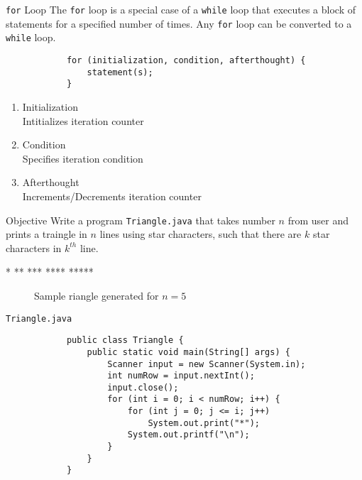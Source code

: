 \documentclass[10pt, compress]{beamer}
\begin{document}
\begin{slide}
	\begin{block}{\texttt{for} Loop}
		The \texttt{for} loop is a special case of a \texttt{while} loop that executes a block of statements for a specified number of times. Any \texttt{for} loop can be converted to a \texttt{while} loop.
		\begin{verbatim}
			for (initialization, condition, afterthought) {
			    statement(s);
			}
		\end{verbatim}
		\begin{enumerate}
			\item Initialization\\Intitializes iteration counter
			\item Condition\\Specifies iteration condition
			\item Afterthought\\Increments/Decrements iteration counter
		\end{enumerate}
	\end{block}
\end{slide}

\begin{slide}
	\begin{block}{Objective}
		Write a program \texttt{Triangle.java} that takes number $n$ from user and prints a traingle in $n$ lines using star characters, such that there are $k$ star characters in $k^{th}$ line.
		\begin{verbbox}
		*
		**
		***
		****
		*****
		\end{verbbox}
		\begin{figure}[H]\centering
		\theverbbox
		\caption{Sample riangle generated for $n = 5$}
		\end{figure}
	\end{block}
\end{slide}

\begin{slide}
	\begin{block}{\texttt{Triangle.java}}
		\begin{verbatim}
			public class Triangle {
			    public static void main(String[] args) {
			        Scanner input = new Scanner(System.in);
			        int numRow = input.nextInt();
			        input.close();
			        for (int i = 0; i < numRow; i++) {
			            for (int j = 0; j <= i; j++)
			                System.out.print("*");
			            System.out.printf("\n");
			        }
			    }
			}
		\end{verbatim}
	\end{block}
\end{slide}

\end{document}
